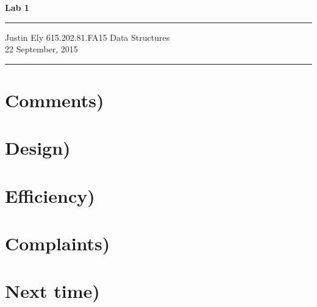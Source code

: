 \documentclass[a4paper,11pt]{article}
\begin{document}
\begin{flushright}

\vspace{1.1cm}

{\bf\Huge Lab 1}

\rule{0.25\linewidth}{0.5pt}

\vspace{0.5cm}
Justin Ely
\linebreak
\newline
\footnotesize{615.202.81.FA15 Data Structures \\}
\vspace{0.5cm}
22 September, 2015
\end{flushright}

\noindent\rule{\linewidth}{1.0pt}


\section*{Comments)}


\section*{Design)}


\section*{Efficiency)}


\section*{Complaints)}


\section*{Next time)}

\end{document}
